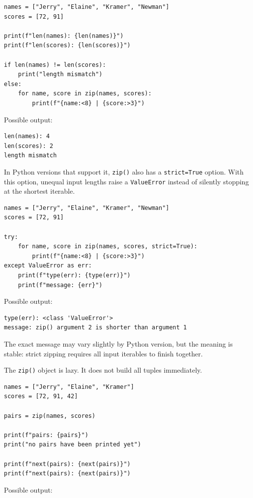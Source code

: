 \documentclass[a4paper,twoside]{report}
\begin{document}
\begin{verbatim}
names = ["Jerry", "Elaine", "Kramer", "Newman"]
scores = [72, 91]

print(f"len(names): {len(names)}")
print(f"len(scores): {len(scores)}")

if len(names) != len(scores):
    print("length mismatch")
else:
    for name, score in zip(names, scores):
        print(f"{name:<8} | {score:>3}")
\end{verbatim}

Possible output:

\begin{verbatim}
len(names): 4
len(scores): 2
length mismatch
\end{verbatim}

In Python versions that support it, \texttt{zip()} also has a \texttt{strict=True} option. With this option, unequal input lengths raise a \texttt{ValueError} instead of silently stopping at the shortest iterable.

\begin{verbatim}
names = ["Jerry", "Elaine", "Kramer", "Newman"]
scores = [72, 91]

try:
    for name, score in zip(names, scores, strict=True):
        print(f"{name:<8} | {score:>3}")
except ValueError as err:
    print(f"type(err): {type(err)}")
    print(f"message: {err}")
\end{verbatim}

Possible output:

\begin{verbatim}
type(err): <class 'ValueError'>
message: zip() argument 2 is shorter than argument 1
\end{verbatim}

The exact message may vary slightly by Python version, but the meaning is stable: strict zipping requires all input iterables to finish together.

The \texttt{zip()} object is lazy. It does not build all tuples immediately.

\begin{verbatim}
names = ["Jerry", "Elaine", "Kramer"]
scores = [72, 91, 42]

pairs = zip(names, scores)

print(f"pairs: {pairs}")
print("no pairs have been printed yet")

print(f"next(pairs): {next(pairs)}")
print(f"next(pairs): {next(pairs)}")
\end{verbatim}

Possible output:
\end{document}
